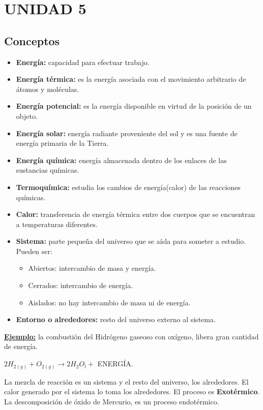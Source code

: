 \saltoPag{}
\section{UNIDAD 5}
    \subsection{Conceptos}
        \begin{itemize}
            \item \textbf{Energía:} capacidad para efectuar trabajo.
            \item \textbf{Energía térmica:} es la energía asociada con el movimiento arbitrario de átomos y moléculas.
            \item \textbf{Energía potencial:} es la energía disponible en virtud de la posición de un objeto.
            \item \textbf{Energía solar:} energía radiante proveniente del sol y es una fuente de energía primaria de la Tierra.
            \item \textbf{Energía química:} energía almacenada dentro de los enlaces de las sustancias químicas.
            \item \textbf{Termoquímica:} estudia los cambios de energía(calor) de las reacciones químicas.
        \end{itemize}
        \begin{itemize}
            \item \textbf{Calor:} transferencia de energía térmica entre dos cuerpos que se encuentran a temperaturas diferentes.
            \item \textbf{Sistema:} parte pequeña del universo que se aísla para someter a estudio. Pueden ser:
                \begin{itemize}
                    \item Abiertos: intercambio de masa y energía.
                    \item Cerrados: intercambio de energía.
                    \item Aislados: no hay intercambio de masa ni de energía.
                \end{itemize}
            \item \textbf{Entorno o alrededores:} resto del universo externo al sistema.
        \end{itemize}
        \textbf{\underline{Ejemplo:}} la combustión del Hidrógeno gaseoso con oxígeno, libera gran cantidad de energía.
        \begin{center} 
            $2H_{2(g)} + O_{2(g)} \rightarrow 2H_2O_{l} +$ ENERGÍA. 
        \end{center}
        \sangria{} La mezcla de reacción es un sistema y el resto del universo, los alrededores. El calor generado por el sistema lo toma los alrededores. El proceso es \textbf{Exotérmico}.
        \sangria{} La descomposición de óxido de Mercurio, es un proceso endotérmico.
